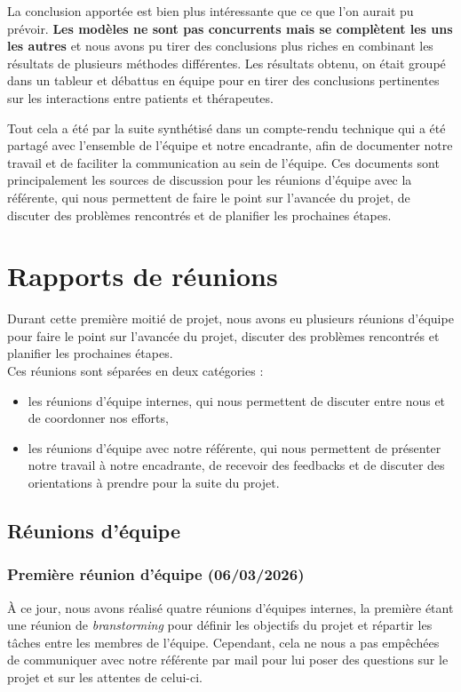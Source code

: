 \documentclass[12pt,a4paper]{article}
\begin{document}
La conclusion apportée est bien plus intéressante que ce que l'on aurait pu prévoir.
\textbf{Les modèles ne sont pas concurrents mais se complètent les uns les autres} et nous avons pu tirer des conclusions plus riches en combinant les résultats de plusieurs méthodes différentes. 
Les résultats obtenu, on était groupé dans un tableur et débattus en équipe pour en tirer des conclusions pertinentes sur les interactions entre patients et thérapeutes.\smallbreak

Tout cela a été par la suite synthétisé dans un compte-rendu technique qui a été partagé avec l'ensemble de l'équipe et notre encadrante, 
afin de documenter notre travail et de faciliter la communication au sein de l'équipe.
Ces documents sont principalement les sources de discussion pour les réunions d'équipe avec la référente, 
qui nous permettent de faire le point sur l'avancée du projet, 
de discuter des problèmes rencontrés et de planifier les prochaines étapes.

\pagebreak
\section{Rapports de réunions}
Durant cette première moitié de projet, nous avons eu plusieurs réunions d'équipe pour faire le point sur l'avancée du projet, 
discuter des problèmes rencontrés et planifier les prochaines étapes.\\
Ces réunions sont séparées en deux catégories :
\begin{itemize}
  \item[1.] les réunions d'équipe internes, qui nous permettent de discuter entre nous et de coordonner nos efforts,
  \item[2.] les réunions d'équipe avec notre référente, qui nous permettent de présenter notre travail à notre encadrante, 
  de recevoir des feedbacks et de discuter des orientations à prendre pour la suite du projet.
\end{itemize}

\subsection{Réunions d'équipe}

\subsubsection{Première réunion d'équipe (06/03/2026)}
À ce jour, nous avons réalisé quatre réunions d'équipes internes, la première étant une réunion de \textit{branstorming} 
pour définir les objectifs du projet et répartir les tâches entre les membres de l'équipe. 
Cependant, cela ne nous a pas empêchées de communiquer avec notre référente par mail pour lui poser des questions sur le projet et sur les attentes de celui-ci.
\end{document}

